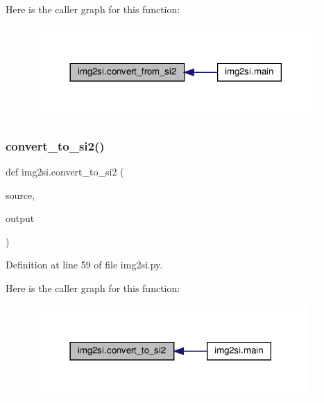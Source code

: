 Here is the caller graph for this function\+:\nopagebreak
\begin{figure}[H]
\begin{center}
\leavevmode
\includegraphics[width=308pt]{namespaceimg2si_a7c848960474f9c9e4beab3df12fb5e64_icgraph}
\end{center}
\end{figure}
\mbox{\label{namespaceimg2si_a792ee72a74ed7abaf28cb4cc1d46869c}} 
\subsubsection{\texorpdfstring{convert\+\_\+to\+\_\+si2()}{convert\_to\_si2()}}
{\footnotesize\ttfamily def img2si.\+convert\+\_\+to\+\_\+si2 (\begin{DoxyParamCaption}\item[{}]{source,  }\item[{}]{output }\end{DoxyParamCaption})}



Definition at line 59 of file img2si.\+py.

Here is the caller graph for this function\+:\nopagebreak
\begin{figure}[H]
\begin{center}
\leavevmode
\includegraphics[width=297pt]{namespaceimg2si_a792ee72a74ed7abaf28cb4cc1d46869c_icgraph}
\end{center}
\end{figure}
\mbox{\label{namespaceimg2si_a30df945259118023030181e530c9f6df}} 
